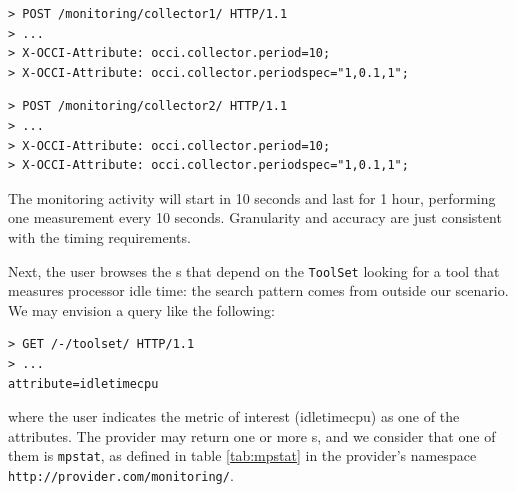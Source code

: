 \documentclass[12pt]{article}  %
\begin{document}
\begin{verbatim}
> POST /monitoring/collector1/ HTTP/1.1
> ...
> X-OCCI-Attribute: occi.collector.period=10;
> X-OCCI-Attribute: occi.collector.periodspec="1,0.1,1";
\end{verbatim}

\begin{verbatim}
> POST /monitoring/collector2/ HTTP/1.1
> ...
> X-OCCI-Attribute: occi.collector.period=10;
> X-OCCI-Attribute: occi.collector.periodspec="1,0.1,1";
\end{verbatim}

The monitoring activity will start in 10 seconds and last for 1 hour, performing one measurement every 10 seconds. Granularity and accuracy are just consistent with the timing requirements.

Next, the user browses the \mi s that depend on the {\tt ToolSet} \mi looking for a tool that measures processor idle time: the search pattern comes from outside our scenario. We may envision a query like the following:

\begin{verbatim}
> GET /-/toolset/ HTTP/1.1
> ...
attribute=idletimecpu
\end{verbatim}

where the user indicates the metric of interest (idletimecpu) as one of the attributes. The provider may return one or more \mi s, and we consider that one of them is {\tt mpstat}, as defined in table \ref{tab:mpstat} in the provider's namespace {\tt http://provider.com/monitoring/}.

\begin{table}
\scriptsize
{}

\caption{Attributes defined for the {\tt mpstat} mixin \label{tab:mpstat}}
\end {table}
\end{document}
